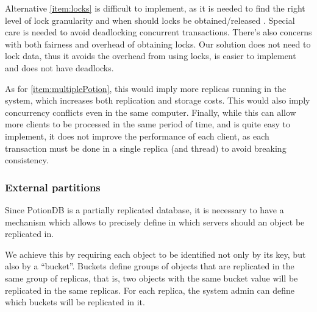 \documentclass{vldb}
\begin{document}

Alternative \ref{item:locks} is difficult to implement, as it is needed to find the right level of lock granularity and when should locks be obtained/released \cite{???}. 
Special care is needed to avoid deadlocking concurrent transactions. 
There's also concerns with both fairness and overhead of obtaining locks.
Our solution does not need to lock data, thus it avoids the overhead from using locks, is easier to implement and does not have deadlocks.

As for \ref{item:multiplePotion}, this would imply more replicas running in the system, which increases both replication and storage costs.
This would also imply concurrency conflicts even in the same computer.
Finally, while this can allow more clients to be processed in the same period of time, and is quite easy to implement, it does not improve the performance of each client, as each transaction must be done in a single replica (and thread) to avoid breaking consistency. %


\subsubsection{External partitions}

Since PotionDB is a partially replicated \cite{???} database, it is necessary to have a mechanism which allows to precisely define in which servers should an object be replicated in.

We achieve this by requiring each object to be identified not only by its key, but also by a ``bucket''.
Buckets define groups of objects that are replicated in the same group of replicas, that is, two objects with the same bucket value will be replicated in the same replicas.
For each replica, the system admin can define which buckets will be replicated in it.
\end{document}
